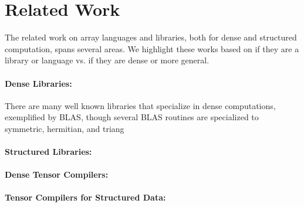 \section{Related Work}

The related work on array languages and libraries, both for dense and structured computation, spans several areas.
%
We highlight these works based on if they are a library or language vs. if they are dense or more general.

\paragraph{Dense Libraries:} There are many well known libraries that specialize in dense computations, exemplified by BLAS, though several BLAS routines are specialized to symmetric, hermitian, and triang

\paragraph{Structured Libraries:}


\paragraph{Dense Tensor Compilers:}

\paragraph{Tensor Compilers for Structured Data:}




